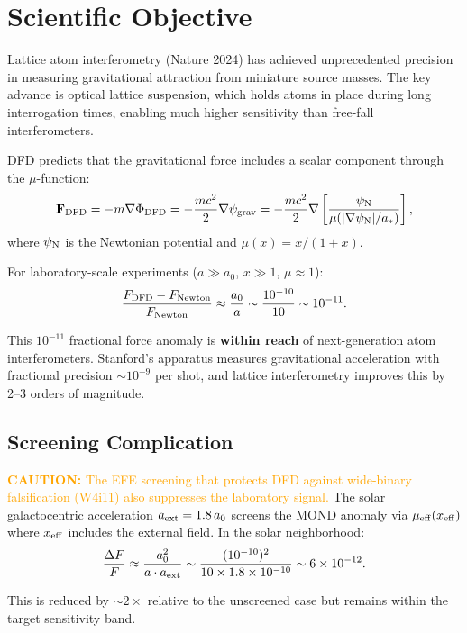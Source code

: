 \documentclass[11pt]{article}
\newcommand{\ee}[1]{\times 10^{#1}}
\newcommand{\caution}[1]{\textcolor{orange}{\textbf{CAUTION:} #1}}
\begin{document}
\section{Scientific Objective}

Lattice atom interferometry (Nature 2024) has achieved unprecedented
precision in measuring gravitational attraction from miniature source
masses. The key advance is optical lattice suspension, which holds atoms
in place during long interrogation times, enabling much higher sensitivity
than free-fall interferometers.

DFD predicts that the gravitational force includes a scalar component
through the $\mu$-function:
\begin{equation}
\mathbf{F}_{\rm DFD} = -m\nabla\Phi_{\rm DFD}
= -\frac{mc^2}{2}\nabla\psi_{\rm grav}
= -\frac{mc^2}{2}\nabla\left[\frac{\psi_{\rm N}}{\mu(|\nabla\psi_{\rm N}|/a_*)}\right],
\end{equation}
where $\psi_{\rm N}$ is the Newtonian potential and $\mu(x) = x/(1+x)$.

For laboratory-scale experiments ($a \gg a_0$, $x \gg 1$, $\mu \approx 1$):
\begin{equation}
\frac{F_{\rm DFD} - F_{\rm Newton}}{F_{\rm Newton}}
\approx \frac{a_0}{a} \sim \frac{10^{-10}}{10}\sim 10^{-11}.
\end{equation}

This $10^{-11}$ fractional force anomaly is \textbf{within reach} of
next-generation atom interferometers. Stanford's apparatus measures
gravitational acceleration with fractional precision $\sim 10^{-9}$
per shot, and lattice interferometry improves this by 2--3 orders of
magnitude.

\subsection{Screening Complication}

\caution{The EFE screening that protects DFD against wide-binary
falsification (W4i11) also suppresses the laboratory signal.}
The solar galactocentric acceleration $a_{\rm ext} = 1.8\,a_0$
screens the MOND anomaly via $\mu_{\rm eff}(x_{\rm eff})$ where
$x_{\rm eff}$ includes the external field. In the solar neighborhood:
\begin{equation}
\frac{\Delta F}{F} \approx \frac{a_0^2}{a \cdot a_{\rm ext}}
\sim \frac{(10^{-10})^2}{10 \times 1.8\ee{-10}} \sim 6\ee{-12}.
\end{equation}

This is reduced by $\sim 2\times$ relative to the unscreened case but
remains within the target sensitivity band.
\end{document}
